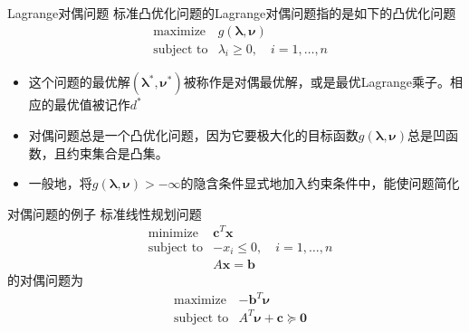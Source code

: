 \begin{frame}

\begin{block}{Lagrange对偶问题}
标准凸优化问题的Lagrange对偶问题指的是如下的凸优化问题
\begin{eqnarray*}
& \text{maximize} & g(\boldsymbol\lambda, \boldsymbol\nu) \\
& \text{subject to} & \lambda_i \ge 0, \quad i = 1,\ldots,n
\end{eqnarray*}

\begin{itemize}
\item 这个问题的最优解$(\boldsymbol\lambda^*, \boldsymbol\nu^*)$被称作是对偶最优解，或是最优Lagrange乘子。相应的最优值被记作$d^*$
\item 对偶问题总是一个凸优化问题，因为它要极大化的目标函数$g(\boldsymbol\lambda, \boldsymbol\nu)$总是凹函数，且约束集合是凸集。
\item 一般地，将$g(\boldsymbol\lambda, \boldsymbol\nu) > -\infty$的隐含条件显式地加入约束条件中，能使问题简化
\end{itemize}
\end{block}

\end{frame}


\begin{frame}

\begin{block}{对偶问题的例子}
标准线性规划问题
\begin{eqnarray*}
& \text{minimize} & \mathbf{c}^T\mathbf{x} \\
& \text{subject to} & -x_i \le 0, \quad i = 1,\ldots,n \\
& & A\mathbf{x} = \mathbf{b}
\end{eqnarray*}
的对偶问题为
\begin{eqnarray*}
& \text{maximize} & -\mathbf{b}^T \boldsymbol\nu \\
& \text{subject to} & A^T \boldsymbol\nu + \mathbf{c} \succcurlyeq \mathbf{0}
\end{eqnarray*}
\end{block}

\end{frame}


